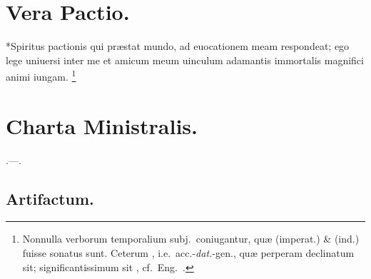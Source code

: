 \documentclass[12pt]{book}
\newcommand{\reconst}{*}
\begin{document}
\section{Vera Pactio.}\label{vera-pactio}
\reconst{}Spiritus pactionis qui præstat mundo,
ad euocationem meam respondeat;
ego lege uniuersi inter me et amicum meum
uinculum adamantis immortalis magnifici animi iungam.
%
\footnote{%
  Nonnulla verborum temporalium subj.\ coniugantur,
  quæ  (imperat.) \&  (ind.) fuisse sonatus sunt.
  Ceterum , i.e.\ acc.-\emph{dat.}-gen.,
  quæ perperam declinatum sit;
  significantissimum sit
  ,
  cf.~Eng.\ .
}


\section{Charta Ministralis.}\label{charta-ministralis}
.---.

\subsection{Artifactum.}\label{artifactum}
\end{document}
